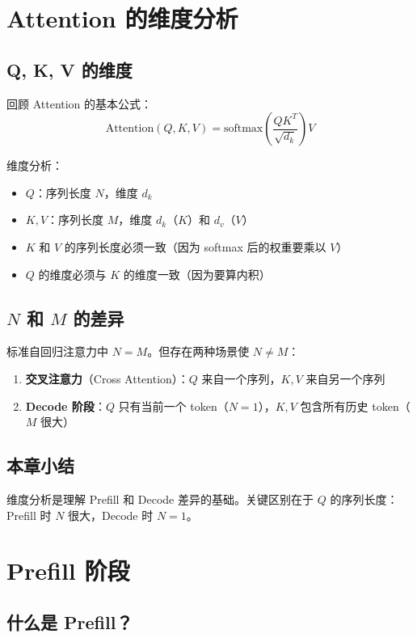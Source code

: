 \documentclass[a4paper]{article}
\begin{document}
\section{Attention 的维度分析}

\subsection{Q, K, V 的维度}

回顾 Attention 的基本公式：
$$
\text{Attention}(Q, K, V) = \text{softmax}\left(\frac{QK^T}{\sqrt{d_k}}\right) V
$$

维度分析：
\begin{itemize}
  \item $Q$：序列长度 $N$，维度 $d_k$
  \item $K, V$：序列长度 $M$，维度 $d_k$（$K$）和 $d_v$（$V$）
  \item $K$ 和 $V$ 的序列长度必须一致（因为 softmax 后的权重要乘以 $V$）
  \item $Q$ 的维度必须与 $K$ 的维度一致（因为要算内积）
\end{itemize}

\subsection{$N$ 和 $M$ 的差异}

标准自回归注意力中 $N = M$。但存在两种场景使 $N \neq M$：
\begin{enumerate}
  \item \textbf{交叉注意力}（Cross Attention）：$Q$ 来自一个序列，$K, V$ 来自另一个序列
  \item \textbf{Decode 阶段}：$Q$ 只有当前一个 token（$N=1$），$K, V$ 包含所有历史 token（$M$ 很大）
\end{enumerate}

\subsection{本章小结}

维度分析是理解 Prefill 和 Decode 差异的基础。关键区别在于 $Q$ 的序列长度：Prefill 时 $N$ 很大，Decode 时 $N = 1$。

\section{Prefill 阶段}

\subsection{什么是 Prefill？}
\end{document}
